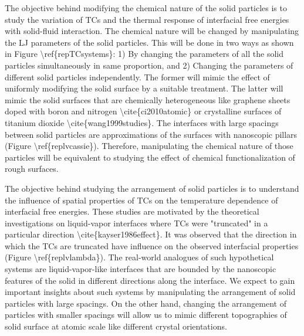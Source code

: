 \par The objective behind modifying the chemical nature of the solid particles is to study the variation of TCs and the thermal response of interfacial free energies with solid-fluid interaction. The chemical nature will be changed by manipulating the LJ parameters of the solid particles. This will be done in two ways as shown in Figure \textbackslash ref\{repTCsystems\}: 1) By changing the parameters of all the solid particles simultaneously in same proportion, and 2) Changing the parameters of different solid particles independently. The former will  mimic the effect of uniformly modifying the solid surface by a suitable treatment. The latter will mimic the solid surfaces that are chemically heterogeneous like graphene sheets doped with boron and nitrogen \textbackslash cite\{ci2010atomic\} or crystalline surfaces of titanium dioxide \textbackslash cite\{wang1999studies\}. The interfaces with large spacings between solid particles are approximations of the surfaces with nanoscopic pillars (Figure \textbackslash ref\{replvcassie\}). Therefore, manipulating the chemical nature of those particles will be equivalent to studying the effect of chemical functionalization of rough surfaces.
\par The objective behind studying the arrangement of solid particles is to understand the influence of spatial properties of TCs on the temperature dependence of interfacial free energies. These studies are motivated by the theoretical investigations on liquid-vapor interfaces where TCs were "truncated" in a particular direction \textbackslash cite\{kayser1986effect\}. It was observed that the direction in which the TCs are truncated have influence on the observed interfacial properties (Figure \textbackslash ref\{replvlambda\}). The real-world analogues of such hypothetical systems are liquid-vapor-like interfaces that are bounded by the nanoscopic features of the solid in different directions along the interface.  We expect to gain important insights about such systems by manipulating the arrangement of solid particles with large spacings. On the other hand, changing the arrangement of particles with smaller spacings will allow us to mimic different topographies of solid surface at atomic scale like different crystal orientations.
